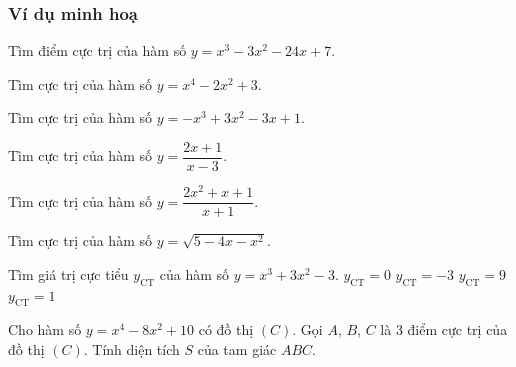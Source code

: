 \subsubsection{Ví dụ minh hoạ}
\begin{vd}%
	Tìm điểm cực trị của hàm số $y=x^3-3x^2-24x+7$.
\end{vd}
\begin{vd}%
	Tìm cực trị của hàm số $y=x^4-2x^2+3$.
\end{vd}
\begin{vd}%
	Tìm cực trị của hàm số $y=-x^3+3x^2-3x+1$.
\end{vd}
\begin{vd}%
	Tìm cực trị của hàm số $y=\dfrac{2x+1}{x-3}$.
\end{vd}
\begin{vd}%
	Tìm cực trị của hàm số $y=\dfrac{2x^2+x+1}{x+1}$.
\end{vd}
\begin{vd}%
	Tìm cực trị của hàm số $y=\sqrt{5-4x-x^2}$.
\end{vd}
\begin{vd}%
	Tìm giá trị cực tiểu $y_{\text{CT}}$ của hàm số $y=x^3+3x^2-3$. 
	\choice
	{$y_{\text{CT}}=0$}
	{\True $y_{\text{CT}}=-3$}
	{$y_{\text{CT}}=9$}
	{$y_{\text{CT}}=1$}
\end{vd}
\begin{vd}%
	Cho hàm số $y=x^4-8x^2+10$ có đồ thị $(C)$. Gọi $A$, $B$, $C$ là $3$ điểm cực trị của đồ thị $(C)$. Tính diện tích $S$ của tam giác $ABC$. 
\end{vd}
